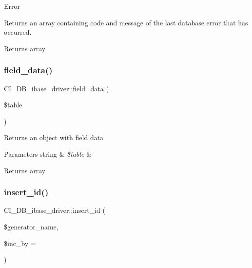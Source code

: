 Error

Returns an array containing code and message of the last database error that has occurred.

\begin{DoxyReturn}{Returns}
array 
\end{DoxyReturn}
\mbox{\label{class_c_i___d_b__ibase__driver_a6913279dbd58aae14b8cb201f738e917}} 
\subsubsection{\texorpdfstring{field\+\_\+data()}{field\_data()}}
{\footnotesize\ttfamily C\+I\+\_\+\+D\+B\+\_\+ibase\+\_\+driver\+::field\+\_\+data (\begin{DoxyParamCaption}\item[{}]{\$table }\end{DoxyParamCaption})}

Returns an object with field data


\begin{DoxyParams}[1]{Parameters}
string & {\em \$table} & \\
\hline
\end{DoxyParams}
\begin{DoxyReturn}{Returns}
array 
\end{DoxyReturn}
\mbox{\label{class_c_i___d_b__ibase__driver_aba89c5dedb6354530c8f2095f98325ba}} 
\subsubsection{\texorpdfstring{insert\+\_\+id()}{insert\_id()}}
{\footnotesize\ttfamily C\+I\+\_\+\+D\+B\+\_\+ibase\+\_\+driver\+::insert\+\_\+id (\begin{DoxyParamCaption}\item[{}]{\$generator\+\_\+name,  }\item[{}]{\$inc\+\_\+by = {} }\end{DoxyParamCaption})}

